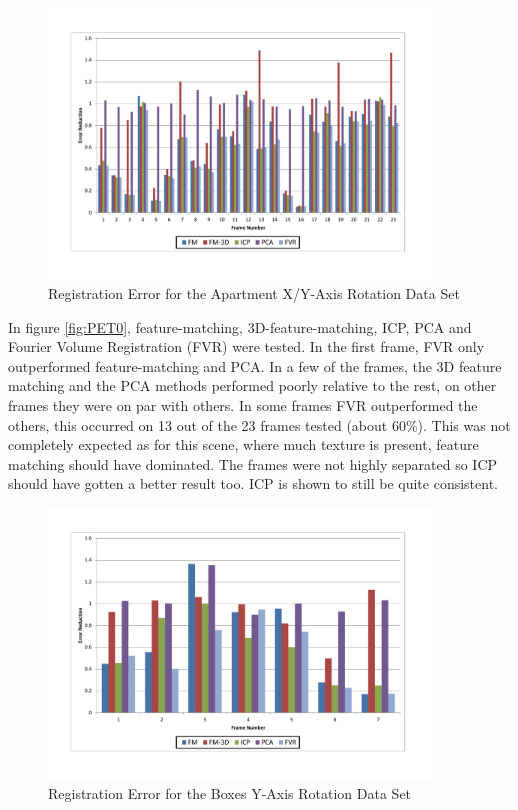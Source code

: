 \begin{figure}[!htb]
\centering
\includegraphics[width=4.0in]{images/results/Apartment_Texture_Rotate_XAxis}
\caption{Registration Error for the Apartment X/Y-Axis Rotation Data Set}
\label{fig:PET1}
\end{figure}

In figure \ref{fig:PET0}, feature-matching, 3D-feature-matching, ICP, PCA and Fourier Volume Registration (FVR) were tested. In the first frame, FVR only outperformed feature-matching and PCA. In a few of the frames, the 3D feature matching and the PCA methods performed poorly relative to the rest, on other frames they were on par with others. In some frames FVR outperformed the others, this occurred on 13 out of the 23 frames tested (about 60\%). This was not completely expected as for this scene, where much texture is present, feature matching should have dominated. The frames were not highly separated so ICP should have gotten a better result too. ICP is shown to still be quite consistent. \\

\begin{figure}[!htb]
\centering
\includegraphics[width=4.0in]{images/results/Boxes_Texture_Rotate}
\caption{Registration Error for the Boxes Y-Axis Rotation Data Set}
\label{fig:PET2}
\end{figure}

